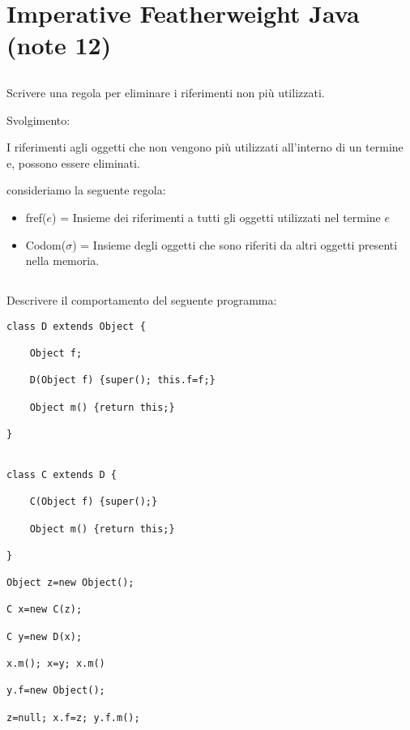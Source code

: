 \section{Imperative Featherweight Java (note 12)}
\vspace{1cm}

\subsection*{}
Scrivere una regola per eliminare i riferimenti non pi\`u utilizzati.


Svolgimento:


I riferimenti agli oggetti che non vengono pi\`u utilizzati all'interno di un termine e, possono essere eliminati.

consideriamo la seguente regola:

\begin{prooftree}
	\end{prooftree}

\vspace{0,5cm}

\begin{itemize}
\item fref($e$) = Insieme dei riferimenti a tutti gli oggetti utilizzati nel termine $e$
\item Codom($\sigma$) = Insieme degli oggetti che sono riferiti da altri oggetti presenti nella memoria.
\end{itemize}

\vspace{1,5cm}



\subsection*{}
Descrivere il comportamento del seguente programma:
 
\begin{lstlisting}
class D extends Object {

	Object f; 
	
	D(Object f) {super(); this.f=f;}
 
	Object m() {return this;}
	
}


class C extends D {

	C(Object f) {super();}
 
	Object m() {return this;}

}

Object z=new Object();

C x=new C(z);

C y=new D(x);

x.m(); x=y; x.m()

y.f=new Object();

z=null; x.f=z; y.f.m();

\end{lstlisting}

